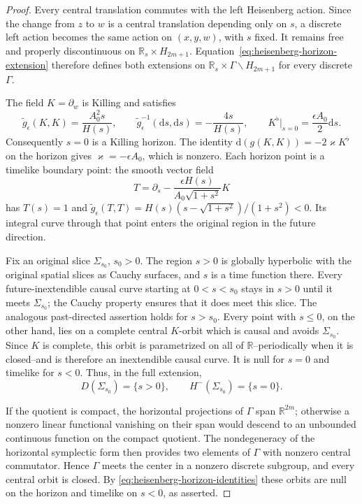 \documentclass[10pt,a4paper]{article}
\numberwithin{equation}{section}
\theoremstyle{definition}
\theoremstyle{remark}
\newcommand{\R}{\mathbb R}
\newcommand{\dd}{\mathrm d}
\begin{document}
\begin{proof}
Every central translation commutes with the left Heisenberg action.
Since the change from $z$ to $w$ is a central translation depending only
on $s$, a discrete left action becomes the same action on $(x,y,w)$,
with $s$ fixed.  It remains free and properly discontinuous on
$\R_s\times H_{2m+1}$.  Equation~\eqref{eq:heisenberg-horizon-extension}
therefore defines both extensions on
$\R_s\times\Gamma\backslash H_{2m+1}$ for every discrete $\Gamma$.

The field $K=\partial_w$ is Killing and satisfies
\begin{equation}
 \widetilde g_\epsilon(K,K)=\frac{A_0^2s}{H(s)},\qquad
 \widetilde g_\epsilon^{-1}(\dd s,\dd s)=-\frac{4s}{H(s)},\qquad
 K^\flat\big|_{s=0}=\frac{\epsilon A_0}{2}\dd s.
 \label{eq:heisenberg-horizon-identities}
\end{equation}
Consequently $s=0$ is a Killing horizon.  The identity
$\dd(g(K,K))=-2\varkappa K^\flat$ on the horizon gives
$\varkappa=-\epsilon A_0$, which is nonzero.
Each horizon point is a timelike boundary point: the smooth vector field
\[
 T=\partial_s-
 \frac{\epsilon H(s)}{A_0\sqrt{1+s^2}}K
\]
has $T(s)=1$ and
$\widetilde g_\epsilon(T,T)
=H(s)(s-\sqrt{1+s^2})/(1+s^2)<0$.
Its integral curve through that point enters the original region in
the future direction.

Fix an original slice $\Sigma_{s_0}$, $s_0>0$.  The region $s>0$ is
globally hyperbolic with the original spatial slices as Cauchy surfaces,
and $s$ is a time function there.  Every future-inextendible causal
curve starting at $0<s<s_0$ stays in $s>0$ until it meets
$\Sigma_{s_0}$; the Cauchy property ensures that it does meet this slice.
The analogous past-directed assertion holds for $s>s_0$.
Every point with $s\le0$, on the other hand, lies on a complete central
$K$-orbit which is causal and avoids $\Sigma_{s_0}$.  Since $K$ is
complete, this orbit is parametrized on all of $\mathbb R$--periodically
when it is closed--and is therefore an inextendible causal curve.  It is
null for $s=0$ and timelike for $s<0$.  Thus, in the full extension,
\[
 D(\Sigma_{s_0})=\{s>0\},\qquad
 H^-(\Sigma_{s_0})=\{s=0\}.
\]

If the quotient is compact, the horizontal projections of $\Gamma$
span $\R^{2m}$; otherwise a nonzero linear functional vanishing on their
span would descend to an unbounded continuous function on the compact
quotient.  The nondegeneracy of the horizontal symplectic form then
provides two elements of $\Gamma$ with nonzero central commutator.
Hence $\Gamma$ meets the center in a nonzero discrete subgroup, and
every central orbit is closed.  By
\eqref{eq:heisenberg-horizon-identities} these orbits are null on the
horizon and timelike on $s<0$, as asserted.
\end{proof}
\end{document}
